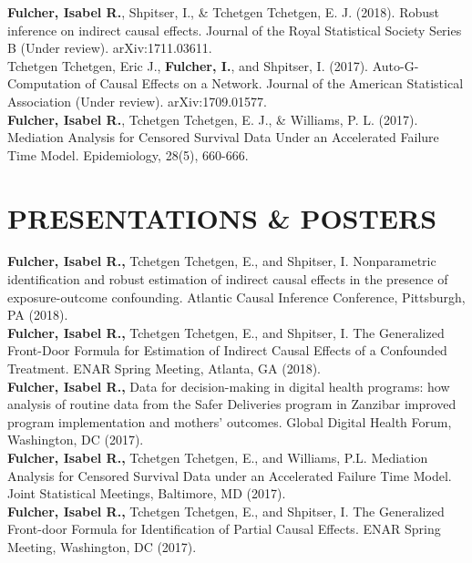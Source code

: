 \documentclass[12pt]{article}
\begin{document}
\textbf{Fulcher, Isabel R.}, Shpitser, I., \& Tchetgen Tchetgen, E. J. (2018). Robust inference on indirect causal effects. Journal of the Royal Statistical Society Series B (Under review). arXiv:1711.03611. \\

Tchetgen Tchetgen, Eric J., \textbf{Fulcher, I.}, and Shpitser, I. (2017). Auto-G-Computation of Causal Effects on a Network. Journal of the American Statistical Association (Under review). arXiv:1709.01577. \\

\textbf{Fulcher, Isabel R.}, Tchetgen Tchetgen, E. J., \& Williams, P. L. (2017). Mediation Analysis for Censored Survival Data Under an Accelerated Failure Time Model. Epidemiology, 28(5), 660-666. 

\section*{\textbf{{\large P}{RESENTATIONS} {\large \&} {\large P}{OSTERS}}}

\textbf{Fulcher, Isabel R.,} Tchetgen Tchetgen, E., and Shpitser, I. Nonparametric identification and robust estimation of indirect causal effects in the presence of exposure-outcome confounding. Atlantic Causal Inference Conference, Pittsburgh, PA (2018). \\

\textbf{Fulcher, Isabel R.,} Tchetgen Tchetgen, E., and Shpitser, I. The Generalized Front-Door Formula for Estimation of Indirect Causal Effects of a Confounded Treatment. ENAR Spring Meeting, Atlanta, GA (2018). \\

\textbf{Fulcher, Isabel R.,} Data for decision-making in digital health programs: how analysis of routine data from the Safer Deliveries program in Zanzibar improved program implementation and mothers' outcomes. Global Digital Health Forum, Washington, DC (2017). \\

\textbf{Fulcher, Isabel R.,} Tchetgen Tchetgen, E., and Williams, P.L. Mediation Analysis for Censored Survival Data under an Accelerated Failure Time Model. Joint Statistical Meetings, Baltimore, MD (2017). \\

\textbf{Fulcher, Isabel R.,} Tchetgen Tchetgen, E., and Shpitser, I. The Generalized Front-door Formula for Identification of Partial Causal Effects. ENAR Spring Meeting, Washington, DC (2017). \\
\end{document}
